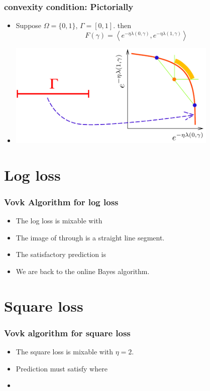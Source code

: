 \documentclass[handout]{beamer}
\begin{document}
\begin{frame}
\frametitle{convexity condition: Pictorially}
\begin{itemize}
\item
{} Suppose $\Omega=\{0,1\}$, $\Gamma = [0,1]$.
then
\[
F(\gamma) = \left\langle
  e^{-\eta \lambda(0,\gamma)},e^{-\eta \lambda(1,\gamma)}
\right\rangle
\]
\item
\begin{center}
\includegraphics[height=5cm]{figures/convex.pdf}
\end{center}
\end{itemize}
\end{frame}

\section{Log loss}

\begin{frame}
\frametitle{Vovk Algorithm for log loss}
\begin{itemize}
\item The log loss is mixable with 
\item The image of \R{$[0,1]$} through  is a straight line segment.
\item The  satisfactory prediction is 
\R{\[
\gamma = \frac{\sum_i \weight{i}{} \gamma_i}{\sum_i \weight{i}{}}
\]}
\item
We are back to the online Bayes algorithm.
\end{itemize}
\end{frame}

\section{Square loss}

\begin{frame}
\frametitle{Vovk algorithm for square loss}
\begin{itemize}
\item The square loss is mixable with $\eta=2$.
\item Prediction must satisfy
where
\item
{}
\end{itemize}
\end{frame}
\end{document}
